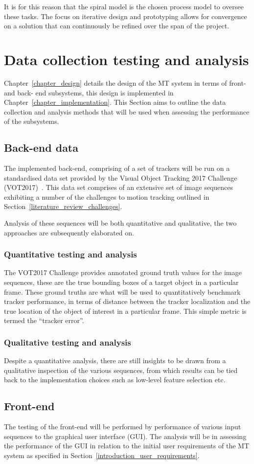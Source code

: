 It is for this reason that the spiral model is the chosen process model to
oversee these tasks. The focus on iterative design and prototyping allows for
convergence on a solution that can continuously be refined over the span of the
project.

\section{Data collection testing and analysis}\label{methodology_testing}
Chapter~\ref{chapter_design} details the design of the MT system in terms of
front- and back- end subsystems, this design is implemented in
Chapter~\ref{chapter_implementation}. This Section aims to outline the data
collection and analysis methods that will be used when assessing the
performance of the subsystems.

\subsection{Back-end data}
The implemented back-end, comprising of a set of trackers will be run on a
standardised data set provided by the Visual Object Tracking 2017 Challenge
(VOT2017)~\cite{VOT2017}. This data set comprises of an extensive set of image
sequences exhibiting a number of the challenges to motion tracking outlined in
Section~\ref{literature_review_challenges}. 

Analysis of these sequences will be both quantitative and qualitative, the two
approaches are subsequently elaborated on.

\subsubsection{Quantitative testing and analysis}
The VOT2017 Challenge provides annotated ground truth values for the image
sequences, these are the true bounding boxes of a target object in a particular
frame. These ground truths are what will be used to quantitatively benchmark
tracker performance, in terms of distance between the tracker localization and
the true location of the object of interest in a particular frame. This simple
metric is termed the ``tracker error''.

\subsubsection{Qualitative testing and analysis}
Despite a quantitative analysis, there are still insights to be drawn from a
qualitative inspection of the various sequences, from which results can be tied
back to the implementation choices such as low-level feature selection etc.

\subsection{Front-end}
The testing of the front-end will be performed by performance of various input
sequences to the graphical user interface (GUI). The analysis will be in assessing the
performance of the GUI in relation to the initial user requirements of the MT
system as specified in Section~\ref{introduction_user_requirements}.


